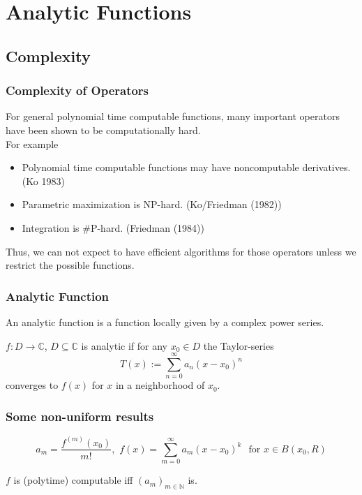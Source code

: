 \documentclass[xcolor=pdftex,dvipsnames,table]{beamer}
\newcommand{\N}{\ensuremath{\mathbb{N}}}
\newcommand{\C}{\ensuremath{\mathbb{C}}}
\begin{document}
\section{Analytic Functions}
\subsection*{Complexity}
\begin{frame}
\frametitle{Complexity of Operators}
\begin{fact}
For general polynomial time computable functions, many important operators have been shown to be computationally hard.\\
For example
\begin{itemize}
\item Polynomial time computable functions may have noncomputable derivatives. (Ko 1983)
\item Parametric maximization is NP-hard. (Ko/Friedman (1982))
\item Integration is \#P-hard. (Friedman (1984))
\end{itemize}
\end{fact}
Thus, we can not expect to have efficient algorithms for those operators unless we restrict the possible functions.
\end{frame}
\begin{frame}
\frametitle{Analytic Function}
An analytic function is a function locally given by a complex power series.\\
\begin{definition}
$f : D \to \C $, $D \subseteq \C$ is analytic if for any $x_0 \in D$ the Taylor-series
$$ T(x) := \sum^\infty_{n=0} a_n(x-x_0)^n$$
converges to $f(x)$ for $x$ in a neighborhood of $x_0$.  
\end{definition}
\end{frame}
\begin{frame}
\frametitle{Some non-uniform results}

$$a_m =\frac{f^{(m)}(x_0)}{m!} 
, \,\, f(x) = \sum_{m=0}^\infty a_m(x-x_0)^k \,\ \text{ for } x \in B(x_0,R)
$$
\vfill
\begin{theorem}
$f$ is (polytime) computable iff $(a_m)_{m \in \N}$ is.
\end{theorem}
\end{frame}
\end{document}
